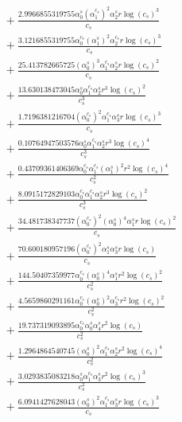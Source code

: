 \documentclass[10pt]{article}
\begin{document}
\begin{align*}
&{}  + \frac{2.9966855319755 \alpha_{0}^s \left(\alpha_{1}^{c_s}\right)^{2} \alpha_{2}^s r \log{\left(c_{s} \right)}^{3}}{c_{s}} \\
&{}  + \frac{3.1216855319755 \alpha_{0}^{c_s} \left(\alpha_{1}^s\right)^{2} \alpha_{2}^{c_s} r \log{\left(c_{s} \right)}^{3}}{c_{s}} \\
&{}  + \frac{25.413782665725 \left(\alpha_{0}^s\right)^{3} \alpha_{1}^{c_s} \alpha_{2}^s r \log{\left(c_{s} \right)}^{2}}{c_{s}} \\
&{}  + \frac{13.630138473045 \alpha_{0}^s \alpha_{1}^{c_s} \alpha_{2}^s r^{3} \log{\left(c_{s} \right)}^{2}}{c_{s}^{3}} \\
&{}  + \frac{1.7196381216704 \left(\alpha_{0}^{c_s}\right)^{2} \alpha_{1}^{c_s} \alpha_{3}^s r \log{\left(c_{s} \right)}^{3}}{c_{s}} \\
&{}  + \frac{0.10764947503576 \alpha_{0}^s \alpha_{1}^{c_s} \alpha_{2}^s r^{3} \log{\left(c_{s} \right)}^{4}}{c_{s}^{3}} \\
&{}  + \frac{0.43709361406369 \alpha_{0}^{c_s} \alpha_{1}^{c_s} \left(\alpha_{1}^s\right)^{2} r^{2} \log{\left(c_{s} \right)}^{4}}{c_{s}^{2}} \\
&{}  + \frac{8.0915172829103 \alpha_{0}^{c_s} \alpha_{1}^{c_s} \alpha_{2}^s r^{3} \log{\left(c_{s} \right)}^{2}}{c_{s}^{3}} \\
&{}  + \frac{34.481738347737 \left(\alpha_{0}^{c_s}\right)^{2} \left(\alpha_{0}^s\right)^{4} \alpha_{1}^s r \log{\left(c_{s} \right)}^{2}}{c_{s}} \\
&{}  + \frac{70.600180957196 \left(\alpha_{0}^{c_s}\right)^{2} \alpha_{1}^s \alpha_{3}^s r \log{\left(c_{s} \right)}}{c_{s}} \\
&{}  + \frac{144.50407359977 \alpha_{0}^{c_s} \left(\alpha_{0}^s\right)^{4} \alpha_{1}^s r^{2} \log{\left(c_{s} \right)}^{2}}{c_{s}^{2}} \\
&{}  + \frac{4.5659860291161 \alpha_{0}^{c_s} \left(\alpha_{0}^s\right)^{2} \alpha_{3}^{c_s} r^{2} \log{\left(c_{s} \right)}^{2}}{c_{s}^{2}} \\
&{}  + \frac{19.737319093895 \alpha_{0}^{c_s} \alpha_{0}^s \alpha_{4}^s r^{2} \log{\left(c_{s} \right)}}{c_{s}^{2}} \\
&{}  + \frac{1.2964864540745 \left(\alpha_{0}^s\right)^{2} \alpha_{1}^{c_s} \alpha_{2}^s r^{2} \log{\left(c_{s} \right)}^{4}}{c_{s}^{2}} \\
&{}  + \frac{3.0293835083218 \alpha_{0}^s \alpha_{1}^{c_s} \alpha_{3}^s r^{2} \log{\left(c_{s} \right)}^{3}}{c_{s}^{2}} \\
&{}  + \frac{6.0941427628043 \left(\alpha_{0}^s\right)^{2} \alpha_{1}^{c_s} \alpha_{3}^s r \log{\left(c_{s} \right)}^{3}}{c_{s}} \\

\end{align*}
\end{document}
